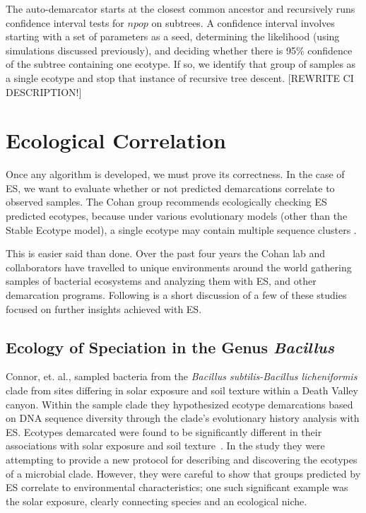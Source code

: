 The auto-demarcator starts at the closest common ancestor and recursively runs confidence interval tests for $npop$ on subtrees.
A confidence interval involves starting with a set of parameters as a seed, determining the likelihood (using simulations discussed previously), and deciding whether there is 95\% confidence of the subtree containing one ecotype.
If so, we identify that group of samples as a single ecotype and stop that instance of recursive tree descent. [REWRITE CI DESCRIPTION!]

\section{Ecological Correlation}
Once any algorithm is developed, we must prove its correctness.
In the case of ES, we want to evaluate whether or not predicted demarcations correlate to observed samples.
The Cohan group recommends ecologically checking ES predicted ecotypes, because under various evolutionary models (other than the Stable Ecotype model), a single ecotype may contain multiple sequence clusters \cite{koeppel2008identifying, connor2010ecology}.

This is easier said than done.
Over the past four years the Cohan lab and collaborators have travelled to unique environments around the world gathering samples of bacterial ecosystems and analyzing them with ES, and other demarcation programs.
Following is a short discussion of a few of these studies focused on further insights achieved with ES.

\subsection*{Ecology of Speciation in the Genus \emph{Bacillus}}
Connor, et. al., sampled bacteria from the \emph{Bacillus subtilis-Bacillus licheniformis} clade from sites differing in solar exposure and soil texture within a Death Valley canyon.
Within the sample clade they hypothesized ecotype demarcations based on DNA sequence diversity through the clade's evolutionary history analysis with ES.
Ecotypes demarcated were found to be significantly different in their associations with solar exposure and soil texture~\cite{connor2010ecology}.
In the study they were attempting to provide a new protocol for describing and discovering the ecotypes of a microbial clade.
However, they were careful to show that groups predicted by ES correlate to environmental characteristics; one such significant example was the solar exposure, clearly connecting species and an ecological niche.

